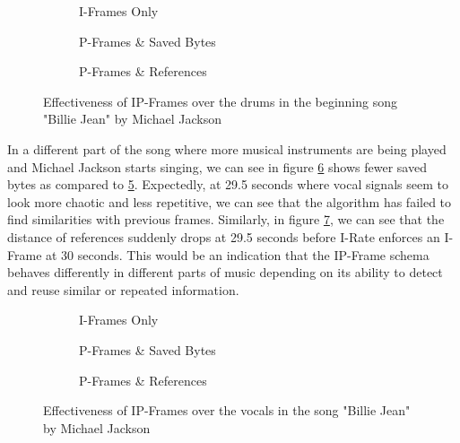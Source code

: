 \begin{figure}[ht]
\centering
\begin{subfigure}{0.30\textwidth}
    
    \caption{I-Frames Only}
    \label{fig:unmodified_25sec}
\end{subfigure}
\hfill
\begin{subfigure}{0.32\textwidth}
    
    \caption{P-Frames \& Saved Bytes}
    \label{fig:saved_25sec}
\end{subfigure}
\hfill
\begin{subfigure}{0.32\textwidth}
    
    \caption{P-Frames \& References}
    \label{fig:ref_25sec}
\end{subfigure}
\caption{Effectiveness of IP-Frames over the drums in the beginning song "Billie Jean" by Michael Jackson}
\label{fig:billie_jean_25sec}
\end{figure}

In a different part of the song where more musical instruments are being played and Michael Jackson starts singing, we can see in figure \ref{fig:saved_3sec} shows fewer saved bytes as compared to \ref{fig:unmodified_3sec}. Expectedly, at 29.5 seconds where vocal signals seem to look more chaotic and less repetitive, we can see that the algorithm has failed to find similarities with previous frames. Similarly, in figure \ref{fig:ref_3sec}, we can see that the distance of references suddenly drops at 29.5 seconds before I-Rate enforces an I-Frame at 30 seconds. This would be an indication that the IP-Frame schema behaves differently in different parts of music depending on its ability to detect and reuse similar or repeated information.

\begin{figure}[ht]
\centering
\begin{subfigure}{0.30\textwidth}
    
    \caption{I-Frames Only}
    \label{fig:unmodified_3sec}
\end{subfigure}
\hfill
\begin{subfigure}{0.32\textwidth}
    
    \caption{P-Frames \& Saved Bytes}
    \label{fig:saved_3sec}
\end{subfigure}
\hfill
\begin{subfigure}{0.32\textwidth}
    
    \caption{P-Frames \& References}
    \label{fig:ref_3sec}
\end{subfigure}
\caption{Effectiveness of IP-Frames over the vocals in the song "Billie Jean" by Michael Jackson}
\label{fig:billie_jean_3sec}
\end{figure}

